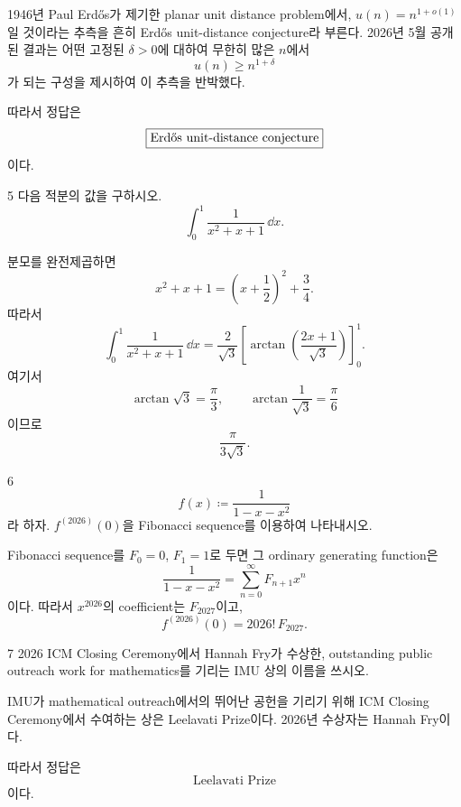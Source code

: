 \begin{solution}
1946년 Paul Erdős가 제기한 planar unit distance problem에서, $u(n)=n^{1+o(1)}$일 것이라는 추측을 흔히 Erdős unit-distance conjecture라 부른다. 2026년 5월 공개된 결과는 어떤 고정된 $\delta>0$에 대하여 무한히 많은 $n$에서
\[
    u(n)\geq n^{1+\delta}
\]
가 되는 구성을 제시하여 이 추측을 반박했다.

따라서 정답은
\[
    \boxed{\text{Erd\H{o}s unit-distance conjecture}}
\]
이다.
\end{solution}

\begin{problem}{5}
다음 적분의 값을 구하시오.
\[
    \int_0^1\frac{1}{x^2+x+1}\,\dd x.
\]
\end{problem}

\begin{solution}
분모를 완전제곱하면
\[
    x^2+x+1
    =
    \left(x+\frac12\right)^2+\frac34.
\]
따라서
\[
    \int_0^1\frac{1}{x^2+x+1}\,\dd x
    =
    \frac{2}{\sqrt3}
    \left[
        \arctan\left(\frac{2x+1}{\sqrt3}\right)
    \right]_0^1.
\]
여기서
\[
    \arctan\sqrt3=\frac{\pi}{3},
    \qquad
    \arctan\frac{1}{\sqrt3}=\frac{\pi}{6}
\]
이므로
\[
    \boxed{\frac{\pi}{3\sqrt3}}.
\]
\end{solution}

\begin{problem}{6}
\[
    f(x)\coloneqq \frac{1}{1-x-x^2}
\]
라 하자. $f^{(2026)}(0)$을 Fibonacci sequence를 이용하여 나타내시오.
\end{problem}

\begin{solution}
Fibonacci sequence를 $F_0=0$, $F_1=1$로 두면 그 ordinary generating function은
\[
    \frac{1}{1-x-x^2}
    =
    \sum_{n=0}^{\infty}F_{n+1}x^n
\]
이다. 따라서 $x^{2026}$의 coefficient는 $F_{2027}$이고,
\[
    \boxed{f^{(2026)}(0)=2026!\,F_{2027}}.
\]
\end{solution}

\begin{problem}{7}
2026 ICM Closing Ceremony에서 Hannah Fry가 수상한, outstanding public outreach work for mathematics를 기리는 IMU 상의 이름을 쓰시오.
\end{problem}

\begin{solution}
IMU가 mathematical outreach에서의 뛰어난 공헌을 기리기 위해 ICM Closing Ceremony에서 수여하는 상은 Leelavati Prize이다. 2026년 수상자는 Hannah Fry이다.

따라서 정답은
\[
    \boxed{\text{Leelavati Prize}}
\]
이다.
\end{solution}

